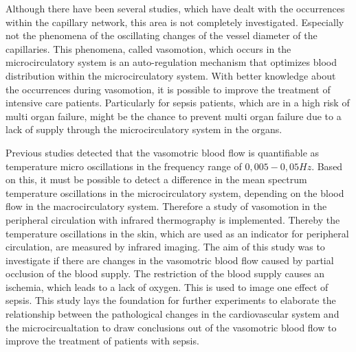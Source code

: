 Although there have been several studies, which have dealt with the occurrences within the capillary network, this area is not completely investigated. Especially not the phenomena of the oscillating changes of the vessel diameter of the capillaries. This phenomena, called vasomotion, which occurs in the microcirculatory system is an auto-regulation mechanism that optimizes blood distribution within the microcirculatory system.
With better knowledge about the occurrences during vasomotion, it is possible to improve the treatment of intensive care patients. Particularly for sepsis patients, which are in a high risk of multi organ failure, might be the chance to prevent multi organ failure due to a lack of supply through the microcirculatory system in the organs.

Previous studies detected that the vasomotric blood flow is quantifiable as temperature micro oscillations in the frequency range of $0,005 - 0,05 Hz$. Based on this, it must be possible to detect a difference in the mean spectrum temperature oscillations in the microcirculatory system, depending on the blood flow in the macrocirculatory system.
Therefore a study of vasomotion in the peripheral circulation with infrared thermography is implemented. Thereby the temperature oscillations in the skin, which are used as an indicator for peripheral circulation, are measured by infrared imaging. The aim of this study was to investigate if there are changes in the vasomotric blood flow caused by partial occlusion of the blood supply. The restriction of the blood supply causes an ischemia, which leads to a lack of oxygen. This is used to image one effect of sepsis.
This study lays the foundation for further experiments to elaborate the relationship between the pathological changes in the cardiovascular system and the microcircualtation to draw conclusions out of the vasomotric blood flow to improve the treatment of patients with sepsis.